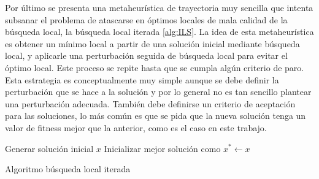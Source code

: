 \smallskip
Por último se presenta una metaheurística de trayectoria muy sencilla que intenta subsanar el problema de atascarse en óptimos locales de mala calidad de la búsqueda local,
la búsqueda local iterada \ref{alg:ILS}.
%
La idea de esta metaheurística es obtener un mínimo local a partir de una solución inicial mediante búsqueda local, y aplicarle una perturbación seguida de búsqueda local para
evitar el óptimo local.
%
Este proceso se repite hasta que se cumpla algún criterio de paro. 
%
Esta estrategia es conceptualmente muy simple aunque se debe definir la perturbación que se hace a la solución y por lo general no es tan sencillo plantear una perturbación adecuada. También debe definirse un criterio de aceptación para las soluciones, lo más común es que se pida que la nueva solución tenga un valor de fitness mejor que la anterior, como es el caso en este trabajo.\\

\begin{algorithm}[H]
 Generar solución inicial $x$\;
 Inicializar mejor solución como $x^*\leftarrow x$
    \label{alg:ILS}
    \caption{Algoritmo búsqueda local iterada}
\end{algorithm}
